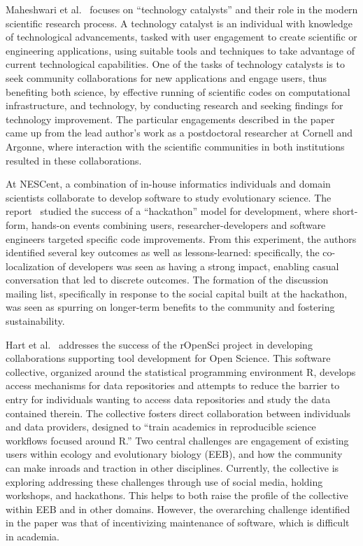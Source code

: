 \documentclass[11pt, oneside]{amsart}
\begin{document}
Maheshwari et al.~\cite{Maheshwari_WSSSPE} focuses on ``technology
catalysts'' and their role in the modern scientific research process. A technology
catalyst is an individual with knowledge of
technological advancements, tasked with user engagement to create
scientific or engineering applications, using suitable tools and techniques
to take advantage of current technological capabilities.
%
One of the tasks of technology catalysts is to seek community collaborations for new
applications and engage users, thus benefiting both science, by effective
running of scientific codes on computational infrastructure, and technology,
by conducting research and seeking findings for technology improvement.
The particular engagements described in the paper came up from the lead author's work as
a postdoctoral researcher at Cornell and Argonne, where interaction with the scientific
communities in both institutions resulted in these collaborations.

At NESCent, a combination of in-house informatics individuals and domain
scientists collaborate to develop software to study evolutionary science.  The
report~\cite{Cranston_WSSSPE} studied the success of a ``hackathon'' model
for development, where short-form, hands-on events combining users,
researcher-developers and software engineers targeted specific code
improvements. From this experiment, the authors identified several key
outcomes as well as lessons-learned: specifically, the co-localization of
developers was seen as having a strong impact, enabling casual conversation
that led to discrete outcomes.  The formation of the discussion mailing list,
specifically in response to the social capital built at the hackathon, was seen
as spurring on longer-term benefits to the community and fostering
sustainability.

Hart et al.~\cite{Hart_WSSSPE} addresses the success of the rOpenSci project in developing
collaborations supporting tool development for Open Science.  This software
collective, organized around the statistical programming environment R,
develops access mechanisms for data repositories and attempts to reduce the
barrier to entry for individuals wanting to access data repositories and study
the data contained therein.  The collective fosters direct collaboration
between individuals and data providers, designed to ``train academics in
reproducible science workflows focused around R.''  Two central challenges
are engagement of existing users within ecology and
evolutionary biology (EEB), and how the community can make inroads and traction
in other disciplines. Currently, the collective is exploring addressing these
challenges through use of social media, holding workshops, and hackathons.
This helps to both raise the profile of the collective within EEB and in other
domains.  However, the overarching challenge identified in the paper was that
of incentivizing maintenance of software, which is difficult in academia.
\end{document}
